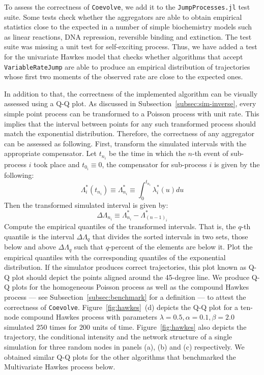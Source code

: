 \documentclass{juliacon}
\numberwithin{equation}{section}
\begin{document}
To assess the correctness of \texttt{Coevolve}, we add it to the \texttt{JumpProcesses.jl} test suite. Some tests check whether the aggregators are able to obtain empirical statistics close to the expected in a number of simple biochemistry models such as linear reactions, DNA repression, reversible binding and extinction. The test suite was missing a unit test for self-exciting process. Thus, we have added a test for the univariate Hawkes model that checks whether algorithms that accept \texttt{VariableRateJump} are able to produce an empirical distribution of trajectories whose first two moments of the observed rate are close to the expected ones.

In addition to that, the correctness of the implemented algorithm can be visually assessed using a Q-Q plot. As discussed in Subsection~\ref{subsec:sim-inverse}, every simple point process can be transformed to a Poisson process with unit rate. This implies that the interval between points for any such transformed process should match the exponential distribution. Therefore, the correctness of any aggregator can be assessed as following. First, transform the simulated intervals with the appropriate compensator. Let \( t_{n_i} \) be the time in which the \( n \)-th event of sub-process \( i \) took place and \( t_{0_i} \equiv 0 \), the compensator for sub-process \( i \) is given by the following:
\begin{equation}
  \Lambda_i^\ast(t_{n_i}) \equiv \Lambda_{n_i}^\ast \equiv \int_0^{t_{n_i}} \lambda_i^\ast(u) du
\end{equation}
Then the transformed simulated interval is given by:
\begin{equation}
  \Delta \Lambda_{n_i} \equiv \Lambda_{n_i}^\ast - \Lambda_{(n-1)_i}^\ast
\end{equation}
Compute the empirical quantiles of the transformed intervals. That is, the \( q \)-th quantile is the interval \( \Delta \Lambda_q \) that divides the sorted intervals in two sets, those below and above \( \Delta \Lambda_q \) such that \( q \)-percent of the elements are below it. Plot the empirical quantiles with the corresponding quantiles of the exponential distribution. If the simulator produces correct trajectories, this plot known as Q-Q plot should depict the points aligned around the 45-degree line. We produce Q-Q plots for the homogeneous Poisson process as well as the compound Hawkes process --- see Subsection~\ref{subsec:benchmark} for a definition --- to attest the correctness of \texttt{Coevolve}. Figure~\ref{fig:hawkes}~(d) depicts the Q-Q plot for a ten-node compound Hawkes process with parameters \( \lambda = 0.5 , \alpha = 0.1 , \beta = 2.0 \) simulated \( 250 \) times for \( 200 \) units of time. Figure~\ref{fig:hawkes} also depicts the trajectory, the conditional intensity and the network structure of a single simulation for three random nodes in panels (a), (b) and (c) respectively. We obtained similar Q-Q plots for the other algorithms that benchmarked the Multivariate Hawkes process below.
\end{document}
